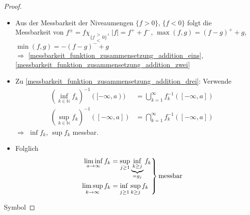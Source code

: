 \begin{proof}
\begin{itemize}
	\item Aus der Messbarkeit der Niveaumengen $\{ f > 0\}$, $\{ f < 0\}$ folgt die Messbarkeit von $f^{\pm} = f\chi_{\{ f \substack{>\\<}0\}}$, $\vert f\vert = f^{+} + f^{-}$, $\max(f,g) = (f - g)^+ + g$, $\min(f,g) = -(f - g)^- + g$ \\
	$\Rightarrow$ \ref{messbarkeit_funktion_zusammensetzung_addition_eins}, \ref{messbarkeit_funktion_zusammensetzung_addition_zwei}
	
	\item Zu \ref{messbarkeit_funktion_zusammensetzung_addition_drei}: Verwende \begin{align*}
		\left(\inf_{k\in\mathbb{N}} f_k\right)^{-1}([-\infty,a)) &= \bigcup_{k=1}^\infty f_k^{-1}([-\infty,a]) \\
		\left(\sup_{k\in\mathbb{N}} f_k\right)^{-1}([-\infty,a]) &= \bigcap_{k=1}^\infty f_k^{-1}([-\infty,a])
	\end{align*}
	$\Rightarrow$ $\inf f_k$, $\sup f_k$ messbar.
	
	\item Folglich \begin{align*}
		\left.\begin{aligned}
			\liminf\limits_{a\to\infty} f_k &= \sup\limits_{j\ge 1} \underbrace{\inf\limits_{k\ge j}}_{=g_j} f_k \\
			\limsup\limits_{k\to\infty} f_k &= \adjustlimits{\inf}_{j\ge 1} {\sup}_{k\ge j} f_k
		\end{aligned}\right\} \begin{gathered}
			\text{messbar}
		\end{gathered}
	\end{align*}
	\end{itemize}
	\hfill\csname\InTheoType Symbol\endcsname
\end{proof}

